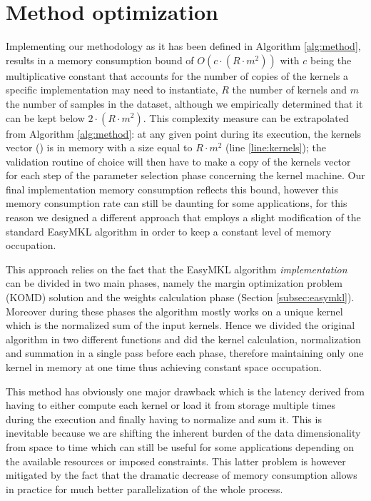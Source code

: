 
\section{Method optimization}
\label{sec:opt}

Implementing our methodology as it has been defined in Algorithm \ref{alg:method},
results in a memory consumption bound of $O(c \cdot (R\cdot m^2))$ with $c$ being
the multiplicative constant that accounts for the number of copies of the kernels
a specific implementation may need to instantiate, $R$ the number of kernels and
$m$ the number of samples in the dataset, although we empirically determined that
it can be kept below $2\cdot (R\cdot m^2)$.
This complexity measure can be extrapolated from  Algorithm \ref{alg:method}:
at any given point during its execution, the kernels vector () is in
memory with a size equal to $R\cdot m^2$ (line \ref{line:kernels});
the validation routine of choice will then have to make a copy of the kernels vector
for each step of the parameter selection phase concerning the kernel machine.
Our final implementation memory consumption reflects this bound, however this
memory consumption rate can still be daunting for some applications,
for this reason we designed a different approach that employs a slight modification
of the standard EasyMKL algorithm \cite{aiolli2015easymkl} in order to keep a
constant level of memory occupation.

This approach relies on the fact that the EasyMKL algorithm \emph{implementation}
can be divided in two main phases, namely the margin optimization problem (KOMD)
solution and the weights calculation phase (Section \ref{subsec:easymkl}).
Moreover during these phases the algorithm mostly works on a unique kernel which is
the normalized sum of the input kernels.
Hence we divided the original algorithm in two different functions and did
the kernel calculation, normalization and summation in a single pass before each phase,
therefore maintaining only one kernel in memory at one time thus achieving constant
space occupation.

This method has obviously one major drawback which is the latency derived from
having to either compute each kernel or load it from storage multiple times
during the execution and finally having to normalize and sum it.
This is inevitable because we are shifting the inherent burden of the data dimensionality
from space to time which can still be useful for some applications
depending on the available resources or imposed constraints.
This latter problem is however mitigated by the fact that the dramatic decrease
of memory consumption allows in practice for much better parallelization of the
whole process.

